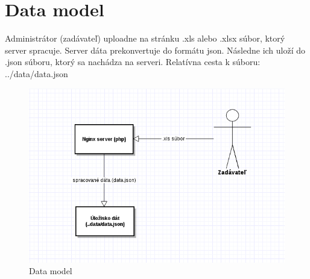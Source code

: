 \documentclass[12pt,a4paper]{report}
\begin{document}
\section[Data model]{\rmfamily\bfseries
	Data model}
Administrátor (zadávateľ) uploadne na stránku .xls alebo .xlsx súbor, ktorý server spracuje. Server dáta prekonvertuje do formátu json. Následne ich uloží do .json súboru, ktorý sa nachádza na serveri. Relatívna cesta k súboru: ../data/data.json
\begin{figure}[htb]
\includegraphics[scale=0.5]{data_model}
\caption[Data model]{Data model}
 \label{fig:Data model}
\end{figure}
\end{document}
